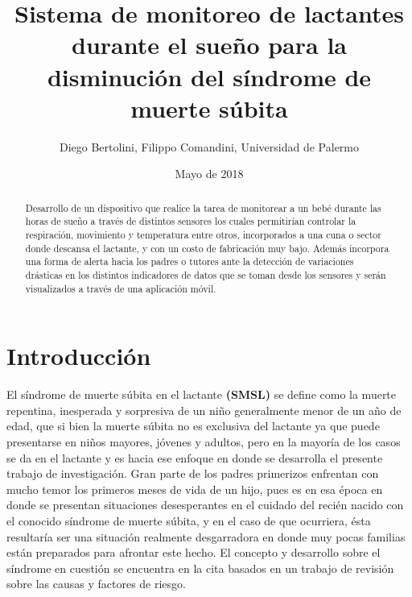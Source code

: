 \documentclass{IEEEtran}
\begin{document}
	\title{Sistema de monitoreo de lactantes durante el sueño para la disminución del síndrome de muerte súbita}
	\author{Diego Bertolini, Filippo Comandini, Universidad de Palermo}
	\date{Mayo de 2018}	
	\maketitle

	
	\begin{abstract}
		Desarrollo de un dispositivo que realice la tarea de monitorear a un bebé durante las horas de sueño a través de distintos sensores los cuales permitirían controlar la respiración, movimiento y temperatura entre otros, incorporados a una cuna o sector donde descansa el lactante, y con un costo de fabricación muy bajo. Además incorpora una forma de alerta hacia los padres o tutores ante la detección de variaciones drásticas en los distintos indicadores de datos que se toman desde los sensores y serán visualizados a través de una aplicación móvil.
	\end{abstract}
	
	\section{Introducción}
	
	
		El síndrome de muerte súbita en el lactante \textbf{(SMSL)} se define como la muerte repentina, inesperada y sorpresiva de un niño generalmente menor de un año de edad, que si bien la muerte súbita no es exclusiva del lactante ya que puede presentarse en niños mayores, jóvenes y adultos, pero en la mayoría de los casos se da en el lactante y es hacia ese enfoque en donde se desarrolla el presente trabajo de investigación. Gran parte de los padres primerizos enfrentan con mucho temor los primeros meses de vida de un hijo, pues es en esa época en donde se presentan situaciones desesperantes en el cuidado del recién nacido con el conocido síndrome de muerte súbita, y en el caso de que ocurriera, ésta resultaría ser una situación realmente desgarradora en donde muy pocas familias están preparados para afrontar este hecho. El concepto y desarrollo sobre el síndrome en cuestión se encuentra en la cita \cite{garcia2008sindrome} basados en un trabajo de revisión sobre las causas y factores de riesgo.
\end{document}
